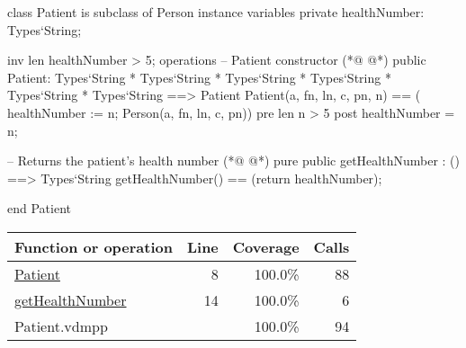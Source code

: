 \begin{vdmpp}[breaklines=true]
class Patient is subclass of Person
instance variables
  private healthNumber: Types`String;
  
  inv len healthNumber > 5;
operations
 -- Patient constructor
(*@
\label{Patient:8}
@*)
 public Patient: Types`String * Types`String * Types`String * Types`String * Types`String * Types`String ==> Patient
  Patient(a, fn, ln, c, pn, n) == ( healthNumber := n; Person(a, fn, ln, c, pn))
 pre len n > 5
 post healthNumber = n;
 
 -- Returns the patient's health number
(*@
\label{getHealthNumber:14}
@*)
 pure public getHealthNumber : () ==> Types`String
  getHealthNumber() == (return healthNumber);

end Patient
\end{vdmpp}
\bigskip
\begin{longtable}{|l|r|r|r|}
\hline
Function or operation & Line & Coverage & Calls \\
\hline
\hline
\hyperref[Patient:8]{Patient} & 8&100.0\% & 88 \\
\hline
\hyperref[getHealthNumber:14]{getHealthNumber} & 14&100.0\% & 6 \\
\hline
\hline
Patient.vdmpp & & 100.0\% & 94 \\
\hline
\end{longtable}

